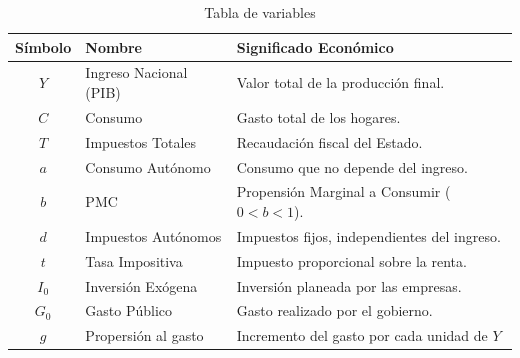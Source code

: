 \begin{table}[h]
\centering
\begin{tabular}{|c|l|l|}
\hline
\textbf{Símbolo} & \textbf{Nombre} & \textbf{Significado Económico} \\ \hline
$Y$ & Ingreso Nacional (PIB) & Valor total de la producción final. \\ \hline
$C$ & Consumo & Gasto total de los hogares. \\ \hline
$T$ & Impuestos Totales & Recaudación fiscal del Estado. \\ \hline
$a$ & Consumo Autónomo & Consumo que no depende del ingreso. \\ \hline
$b$ & PMC & Propensión Marginal a Consumir ($0 < b < 1$). \\ \hline
$d$ & Impuestos Autónomos & Impuestos fijos, independientes del ingreso. \\ \hline
$t$ & Tasa Impositiva & Impuesto proporcional sobre la renta. \\ \hline
$I_0$ & Inversión Exógena & Inversión planeada por las empresas. \\ \hline
$G_0$ & Gasto Público & Gasto realizado por el gobierno. \\ \hline
$g$ & Propersión al gasto & Incremento del gasto por cada unidad de \(Y\) \\ \hline
\end{tabular}
\caption{Tabla de variables}
\label{Significado_Variables_ingreso_nacional}
\end{table}
